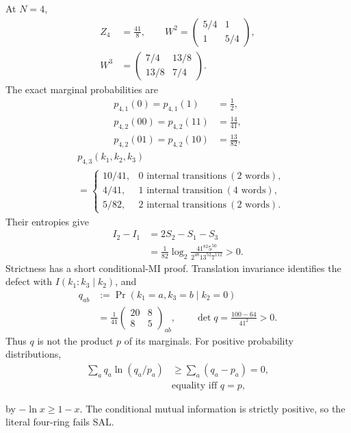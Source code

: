 \documentclass[aps,pra,reprint,nofootinbib,onecolumn]{revtex4-2}
\begin{document}
At $N=4$,
\begin{align}
	Z_4 & =\frac{41}{8},\qquad
	W^2=\begin{pmatrix}5/4&1\\1&5/4\end{pmatrix},\nonumber \\
	W^3 & =\begin{pmatrix}7/4&13/8\\13/8&7/4\end{pmatrix}.
	\label{eq:W-powers}
\end{align}
The exact marginal probabilities are
\begin{align}
	p_{4,1}(0)=p_{4,1}(1)   & =\tfrac12,\nonumber      \\
	p_{4,2}(00)=p_{4,2}(11) & =\frac{14}{41},\nonumber \\
	p_{4,2}(01)=p_{4,2}(10) & =\frac{13}{82},
	\label{eq:p41-p42}
\end{align}
\begin{align}
	 & p_{4,3}(k_1,k_2,k_3)\nonumber                               \\
	 & =\begin{cases}
		    10/41, & 0\text{ internal transitions}\ (2\text{ words}), \\
		    4/41,  & 1\text{ internal transition}\ (4\text{ words}),  \\
		    5/82,  & 2\text{ internal transitions}\ (2\text{ words}).
	    \end{cases}
	\label{eq:p43}
\end{align}
Their entropies give
\begin{align}
	I_2-I_1 & =2S_2-S_1-S_3\nonumber \\
	        & =\frac1{82}\log_2
	\frac{41^{82}5^{50}}{2^{48}13^{52}7^{112}}>0.
	\label{eq:I2-I1-defect}
\end{align}
Strictness has a short conditional-MI proof. Translation invariance
identifies the defect with $I(k_1:k_3\mid k_2)$, and
\begin{align}
	q_{ab} & :=\Pr(k_1=a,k_3=b\mid k_2=0)\nonumber                  \\
	       & =\frac1{41}\begin{pmatrix}20&8\\8&5\end{pmatrix}_{ab},
	\qquad \det q=\frac{100-64}{41^2}>0.
	\label{eq:q-conditional}
\end{align}
Thus $q$ is not the product $p$ of its marginals. For positive
probability distributions,
\begin{align}
	\sum_aq_a\ln(q_a/p_a)
	 & \geq\sum_a(q_a-p_a)=0,\nonumber \\
	 & \text{equality iff }q=p,
	\label{eq:kl-positivity}
\end{align}
\begin{refutation}
	by $-\ln x\geq1-x$. The conditional mutual information is
	strictly positive, so the literal four-ring fails SAL.
\end{refutation}
\end{document}
